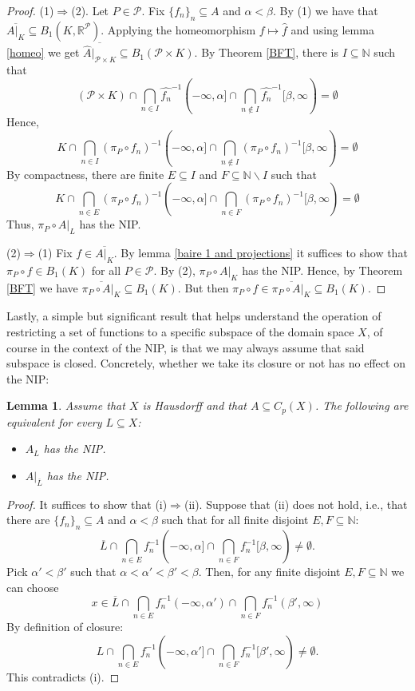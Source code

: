 \documentclass[psamsfonts]{amsart}
\newtheorem{lem}[thm]{Lemma}
\theoremstyle{definition}
\theoremstyle{remark}
\numberwithin{equation}{section}
\begin{document}
\begin{proof}
    (1)$\Rightarrow$(2). Let $P\in\mathcal{P}$. Fix $\{f_n\}_n\subseteq A$ and $\alpha<\beta$. By (1) we have that $\overline{A|_K}\subseteq B_1(K,\mathbb{R}^\mathcal{P})$. Applying the homeomorphism $f\mapsto \hat{f}$ and using lemma \ref{homeo} we get $\overline{\hat{A}|_{\mathcal{P}\times K}}\subseteq B_1(\mathcal{P}\times K)$. By Theorem \ref{BFT}, there is $I\subseteq\mathbb{N}$ such that
    $$(\mathcal{P}\times K)\cap\bigcap_{n\in I}\hat{f_n}^{-1}(-\infty,\alpha]\cap\bigcap_{n\notin I}\hat{f_n}^{-1}[\beta,\infty)=\emptyset$$
    Hence,
    $$K\cap\bigcap_{n\in I}(\pi_P\circ f_n)^{-1}(-\infty,\alpha]\cap\bigcap_{n\notin I}(\pi_P\circ f_n)^{-1}[\beta,\infty)=\emptyset$$
    By compactness, there are finite $E\subseteq I$ and $F\subseteq\mathbb{N}\backslash I$ such that
    $$K\cap\bigcap_{n\in E}(\pi_P\circ f_n)^{-1}(-\infty,\alpha]\cap\bigcap_{n\in F}(\pi_P\circ f_n)^{-1}[\beta,\infty)=\emptyset$$
    Thus, $\pi_P\circ A|_L$ has the NIP.

    (2)$\Rightarrow$(1) Fix $f\in\overline{A|_K}$. By lemma \ref{baire 1 and projections} it suffices to show that $\pi_P\circ f\in B_1(K)$ for all $P\in\mathcal{P}$. By (2), $\pi_P\circ A|_K$ has the NIP. Hence, by Theorem \ref{BFT} we have $\overline{\pi_P\circ A|_K}\subseteq B_1(K)$. But then $\pi_P\circ f\in\overline{\pi_P\circ A|_K}\subseteq B_1(K)$.
\end{proof}

Lastly, a simple but significant result that helps understand the operation of restricting a set of functions to a specific subspace of the domain space $X$, of course in the context of the NIP, is that we may always assume that said subspace is closed. Concretely, whether we take its closure or not has no effect on the NIP:

\begin{lem}\label{NIP and closure}
    Assume that $X$ is Hausdorff and that $A\subseteq C_p(X)$. The following are equivalent for every $L\subseteq X$:
    \begin{itemize}
        \item [(i)] $A_L$ has the NIP.
        \item [(ii)] $A|_{\overline{L}}$ has the NIP.
    \end{itemize}
\end{lem}

\begin{proof}
    It suffices to show that (i)$\Rightarrow$(ii). Suppose that (ii) does not hold, i.e., that there are $\{f_n\}_n\subseteq A$ and $\alpha<\beta$ such that for all finite disjoint $E,F\subseteq\mathbb{N}$:
    $$\overline{L}\cap\bigcap_{n\in E}f_n^{-1}(-\infty,\alpha]\cap\bigcap_{n\in F}f_n^{-1}[\beta,\infty)\neq\emptyset.$$
    Pick $\alpha'<\beta'$ such that $\alpha<\alpha'<\beta'<\beta$. Then, for any finite disjoint $E,F\subseteq\mathbb{N}$ we can choose
    $$x\in\overline{L}\cap\bigcap_{n\in E}f_n^{-1}(-\infty,\alpha')\cap\bigcap_{n\in F}f_n^{-1}(\beta',\infty)$$
    By definition of closure:
    $$L\cap\bigcap_{n\in E}f_n^{-1}(-\infty,\alpha']\cap\bigcap_{n\in F}f_n^{-1}[\beta',\infty)\neq\emptyset.$$
    This contradicts (i).
\end{proof}
\end{document}
